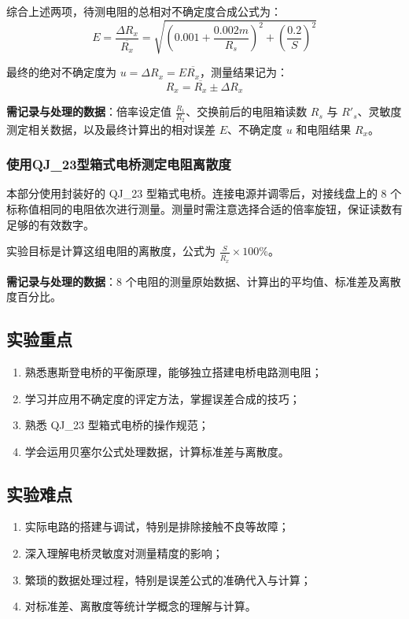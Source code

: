 \documentclass{../../templates/Report}%
\begin{document}
综合上述两项，待测电阻的总相对不确定度合成公式为：
\[E = \frac{\Delta R_x}{\overline{R_x}} = \sqrt{\left(0.001+ \frac{0.002m}{R_s}\right)^2 + \left(\frac{0.2}{S}\right)^2}\]

最终的绝对不确定度为 $u = \Delta R_x = E \overline{R_x}$，测量结果记为：
\[R_x = \overline{R_x} \pm \Delta R_x\]

\textbf{需记录与处理的数据}：倍率设定值 $\frac{R_1}{R_2}$、交换前后的电阻箱读数 $R_s$ 与 $R'_s$、灵敏度测定相关数据，以及最终计算出的相对误差 $E$、不确定度 $u$ 和电阻结果 $R_x$。

\subsubsection{使用QJ\_23型箱式电桥测定电阻离散度}
本部分使用封装好的 QJ\_23 型箱式电桥。连接电源并调零后，对接线盘上的 8 个标称值相同的电阻依次进行测量。测量时需注意选择合适的倍率旋钮，保证读数有足够的有效数字。

实验目标是计算这组电阻的离散度，公式为 $\frac{S}{\overline{R_x}} \times 100\%$。

\textbf{需记录与处理的数据}：8 个电阻的测量原始数据、计算出的平均值、标准差及离散度百分比。

\subsection{实验重点}
\begin{enumerate}
    \item 熟悉惠斯登电桥的平衡原理，能够独立搭建电桥电路测电阻；
    \item 学习并应用不确定度的评定方法，掌握误差合成的技巧；
    \item 熟悉 QJ\_23 型箱式电桥的操作规范；
    \item 学会运用贝塞尔公式处理数据，计算标准差与离散度。
\end{enumerate}

\subsection{实验难点}
\begin{enumerate}
    \item 实际电路的搭建与调试，特别是排除接触不良等故障；
    \item 深入理解电桥灵敏度对测量精度的影响；
    \item 繁琐的数据处理过程，特别是误差公式的准确代入与计算；
    \item 对标准差、离散度等统计学概念的理解与计算。
\end{enumerate}
\end{document}
